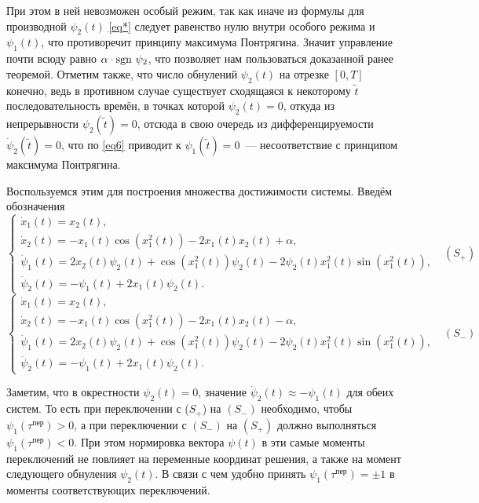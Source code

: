 \documentclass[a4paper,12pt]{article}
\begin{document}
При этом в ней невозможен особый режим, так как иначе из формулы для производной $\psi_2(t)$ \eqref{eq*} следует равенство нулю внутри особого режима и $\psi_1(t)$, что противоречит принципу максимума Понтрягина. Значит
 управление почти всюду равно $\alpha \cdot \sgn \ \psi_2$, что позволяет нам пользоваться доказанной ранее теоремой. Отметим также, что число обнулений $\psi_2(t)$ на отрезке $[0, T]$ конечно, ведь в противном случае существует сходящаяся к некоторому $\tilde{t}$ последовательность времён, в точках которой $\psi_2(t) = 0$, откуда из непрерывности $\psi_2(\tilde{t}) = 0$, отсюда в свою очередь из дифференцируемости $\dot{\psi}_2(\tilde{t}) = 0$, что по \eqref{eq6} приводит к $\psi_1(\tilde{t}) = 0$~--- несоответствие с принципом максимума Понтрягина. 

Воспользуемся этим для построения множества достижимости системы. Введём обозначения
$$ \begin{cases}
		\dot{x}_1(t) = x_2(t), \\
		\dot{x}_2(t) = -x_1(t)\cos\left(x_1^2(t)\right) - 2x_1(t)x_2(t) + \alpha, \\
		\dot{\psi}_1(t) = 2x_2(t)\psi_2(t) + \cos \left( x_1^2(t) \right)\psi_2(t) - 2 \psi_2(t) x_1^2(t) \sin \left( x_1^2(t) \right), \\
		\dot{\psi}_2(t) = -\psi_1(t) + 2x_1(t) \psi_2(t). 
\end{cases} \ \ \ (S_{+})$$
$$ \begin{cases}
		\dot{x}_1(t) = x_2(t), \\
		\dot{x}_2(t) = -x_1(t)\cos\left(x_1^2(t)\right) - 2x_1(t)x_2(t) - \alpha, \\
		\dot{\psi}_1(t) = 2x_2(t)\psi_2(t) + \cos \left( x_1^2(t) \right)\psi_2(t) - 2 \psi_2(t) x_1^2(t) \sin \left( x_1^2(t) \right), \\
		\dot{\psi}_2(t) = -\psi_1(t) + 2x_1(t) \psi_2(t). 
\end{cases} \ \ \ (S_{-})$$

Заметим, что в окрестности $\psi_2(t) = 0$, значение $\dot{\psi}_2(t) \approx -\psi_1(t)$ для обеих систем. То есть при переключении с ($S_{+}$) на $(S_{-})$ необходимо, чтобы $\psi_1(\tau^{\text{пер}}) > 0$, а при переключении с $(S_{-})$ на $(S_{+})$ должно выполняться $\psi_1(\tau^{\text{пер}}) < 0$. При этом нормировка вектора $\psi(t)$ в эти самые моменты переключений не повлияет на переменные координат решения, а также на момент следующего обнуления $\psi_2(t)$. В связи с чем удобно принять $\psi_1(\tau^{\text{пер}}) = \pm 1$ в моменты соответствующих переключений.
\end{document}
